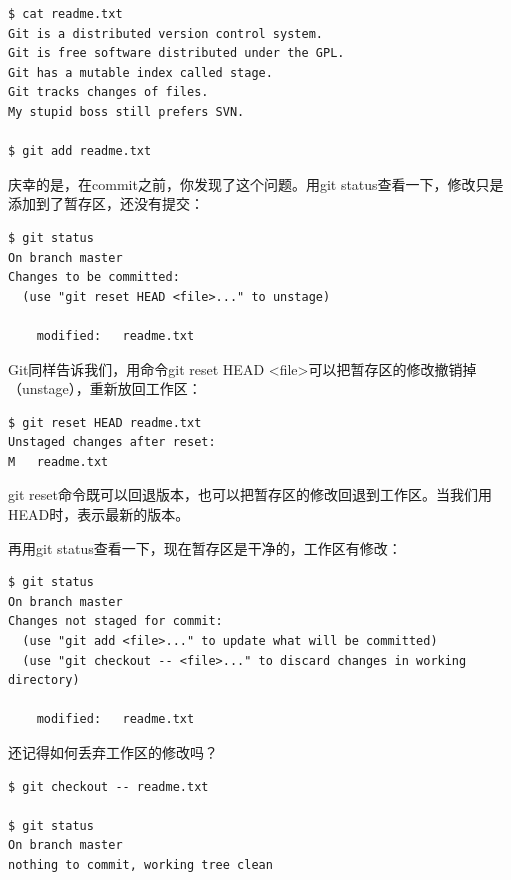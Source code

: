 \begin{verbatim}
$ cat readme.txt
Git is a distributed version control system.
Git is free software distributed under the GPL.
Git has a mutable index called stage.
Git tracks changes of files.
My stupid boss still prefers SVN.

$ git add readme.txt
\end{verbatim}

庆幸的是，在commit之前，你发现了这个问题。用git status查看一下，修改只是添加到了暂存区，还没有提交：

\begin{verbatim}
$ git status
On branch master
Changes to be committed:
  (use "git reset HEAD <file>..." to unstage)

    modified:   readme.txt
\end{verbatim}

Git同样告诉我们，用命令git reset HEAD <file>可以把暂存区的修改撤销掉（unstage），重新放回工作区：

\begin{verbatim}
$ git reset HEAD readme.txt
Unstaged changes after reset:
M	readme.txt
\end{verbatim}

git reset命令既可以回退版本，也可以把暂存区的修改回退到工作区。当我们用HEAD时，表示最新的版本。

再用git status查看一下，现在暂存区是干净的，工作区有修改：

\begin{verbatim}
$ git status
On branch master
Changes not staged for commit:
  (use "git add <file>..." to update what will be committed)
  (use "git checkout -- <file>..." to discard changes in working directory)

    modified:   readme.txt
\end{verbatim}

还记得如何丢弃工作区的修改吗？

\begin{verbatim}
$ git checkout -- readme.txt

$ git status
On branch master
nothing to commit, working tree clean
\end{verbatim}

